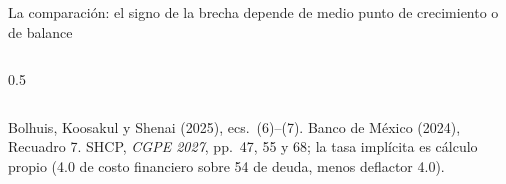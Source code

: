 \documentclass[aspectratio=169,11pt]{beamer}
\newcommand{\fuente}[1]{\par\vfill{\small\color{cGris}#1\par}}
\newcommand{\BKS}{Bolhuis, Koosakul y Shenai (2025)}
\begin{document}
\begin{frame}{La comparación: el signo de la brecha depende de medio punto de crecimiento o de balance}
\begin{columns}[T]
\begin{column}{0.5\textwidth}
\begin{itemize}
      \end{itemize}
    \end{column}
  \end{columns}
  \fuente{\BKS, ecs.~(6)--(7). Banco de México (2024), Recuadro 7. SHCP, \emph{CGPE 2027}, pp.~47, 55 y 68; la tasa implícita es cálculo propio (4.0 de costo financiero sobre 54 de deuda, menos deflactor 4.0).}
\end{frame}

\end{document}
